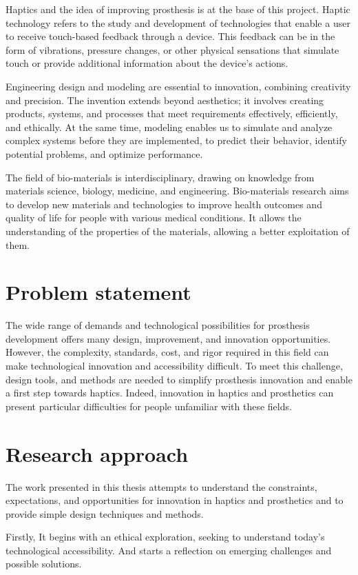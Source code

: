 Haptics and the idea of improving prosthesis is at the base of this project. Haptic technology refers to the study and development of technologies that enable a user to receive touch-based feedback through a device. This feedback can be in the form of vibrations, pressure changes, or other physical sensations that simulate touch or provide additional information about the device's actions.

Engineering design and modeling are essential to innovation, combining creativity and precision. The invention extends beyond aesthetics; it involves creating products, systems, and processes that meet requirements effectively, efficiently, and ethically. At the same time, modeling enables us to simulate and analyze complex systems before they are implemented, to predict their behavior, identify potential problems, and optimize performance.

The field of bio-materials is interdisciplinary, drawing on knowledge from materials science, biology, medicine, and engineering. Bio-materials research aims to develop new materials and technologies to improve health outcomes and quality of life for people with various medical conditions. It allows the understanding of the properties of the materials, allowing a better exploitation of them.

\section{Problem statement}
The wide range of demands and technological possibilities for prosthesis development offers many design, improvement, and innovation opportunities. However, the complexity, standards, cost, and rigor required in this field can make technological innovation and accessibility difficult. To meet this challenge, design tools, and methods are needed to simplify prosthesis innovation and enable a first step towards haptics. Indeed, innovation in haptics and prosthetics can present particular difficulties for people unfamiliar with these fields.

\section{Research approach}
The work presented in this thesis attempts to understand the constraints, expectations, and opportunities for innovation in haptics and prosthetics and to provide simple design techniques and methods.

Firstly, It begins with an ethical exploration, seeking to understand today's technological accessibility. And starts a reflection on emerging challenges and possible solutions.

